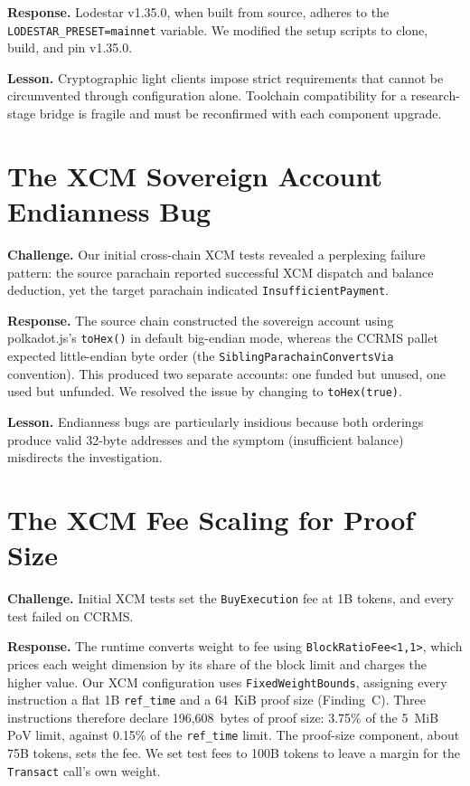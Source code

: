 \textbf{Response.} Lodestar v1.35.0, when built from source, adheres to the \texttt{LODESTAR\_PRESET=mainnet} variable. We modified the setup scripts to clone, build, and pin v1.35.0.

\textbf{Lesson.} Cryptographic light clients impose strict requirements that cannot be circumvented through configuration alone. Toolchain compatibility for a research-stage bridge is fragile and must be reconfirmed with each component upgrade.

\section{The XCM Sovereign Account Endianness Bug}\label{sec:xcm-endianness}

\textbf{Challenge.} Our initial cross-chain XCM tests revealed a perplexing failure pattern: the source parachain reported successful XCM dispatch and balance deduction, yet the target parachain indicated \texttt{InsufficientPayment}.

\textbf{Response.} The source chain constructed the sovereign account using polkadot.js's \texttt{toHex()} in default big-endian mode, whereas the CCRMS pallet expected little-endian byte order (the \texttt{SiblingParachainConvertsVia} convention). This produced two separate accounts: one funded but unused, one used but unfunded. We resolved the issue by changing to \texttt{toHex(true)}.

\textbf{Lesson.} Endianness bugs are particularly insidious because both orderings produce valid 32-byte addresses and the symptom (insufficient balance) misdirects the investigation.

\section{The XCM Fee Scaling for Proof Size}\label{sec:xcm-fee-scaling}

\textbf{Challenge.} Initial XCM tests set the \texttt{BuyExecution} fee at 1B tokens, and every test failed on CCRMS.

\textbf{Response.} The runtime converts weight to fee using \texttt{BlockRatioFee<1,1>}, which prices each weight dimension by its share of the block limit and charges the higher value. Our XCM configuration uses \texttt{FixedWeightBounds}, assigning every instruction a flat 1B \texttt{ref\_time} and a 64~KiB proof size (Finding~C). Three instructions therefore declare 196,608~bytes of proof size: 3.75\% of the 5~MiB PoV limit, against 0.15\% of the \texttt{ref\_time} limit. The proof-size component, about 75B tokens, sets the fee. We set test fees to 100B tokens to leave a margin for the \texttt{Transact} call's own weight.

